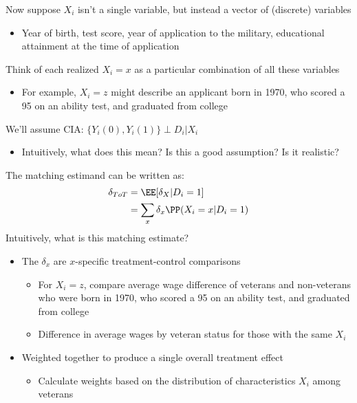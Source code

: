 \documentclass[compress, 8pt]{beamer}
\begin{document}
\begin{frame}{}

Now suppose $X_i$ isn't a single variable, but instead a vector of (discrete) variables
\begin{itemize}
    \item Year of birth, test score, year of application to the military, educational attainment at the time of application
\end{itemize}
Think of each realized $X_i=x$ as a particular combination of all these variables
\begin{itemize}
    \item {\color{DarkGray}For example, $X_i = z$ might describe an applicant born in 1970, who scored a 95 on an ability test, and graduated from college}
\end{itemize}
We'll assume CIA: $\{Y_i(0), Y_i (1)\} \perp D_i \vert X_i$ 
\begin{itemize}
    \item Intuitively, what does this mean? Is this a good assumption? Is it realistic?
\end{itemize}
The matching estimand can be written as:
\begin{align*}
    \delta_{ToT} %
    &= \EE [\delta_X \vert D_i = 1] \\
    &= \sum_{x} \delta_x \PP(X_i = x \vert D_i = 1 ) 
\end{align*}
Intuitively, what is this matching estimate?
\begin{itemize}
    \item The $\delta_{x}$ are $x$-specific treatment-control comparisons
    \begin{itemize}
        \item {\color{DarkGray}For $X_i = z$, compare average wage difference of veterans and non-veterans who were born in 1970, who scored a 95 on an ability test, and graduated from college}
        \item Difference in average wages by veteran status for those with the same $X_i$
    \end{itemize}
    \item Weighted together to produce a single overall treatment effect
    \begin{itemize}
        \item {\color{DarkGray} Calculate weights based on the distribution of characteristics $X_i$ among veterans}
    \end{itemize}
\end{itemize}

\end{frame}
\end{document}
